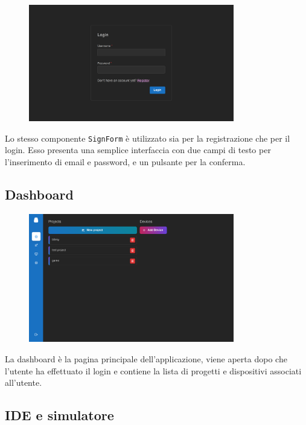 \begin{figure}[H]
    \centering
    \includegraphics[width=0.8\textwidth]{images/chapter7/login.png}
    \label{fig:login}
  \end{figure}

Lo stesso componente \texttt{SignForm} è utilizzato sia per la registrazione che per il login. 
Esso presenta una semplice interfaccia con due campi di testo per l'inserimento di email e password,
e un pulsante per la conferma.

\subsection{Dashboard}

\begin{figure}[H]
    \centering
    \includegraphics[width=0.8\textwidth]{images/chapter7/dashboard.png}
    \label{fig:dashboard}
  \end{figure}

La dashboard è la pagina principale dell'applicazione, viene aperta dopo che l'utente ha effettuato il login 
e contiene la lista di progetti e dispositivi associati all'utente.

\subsection{IDE e simulatore}

